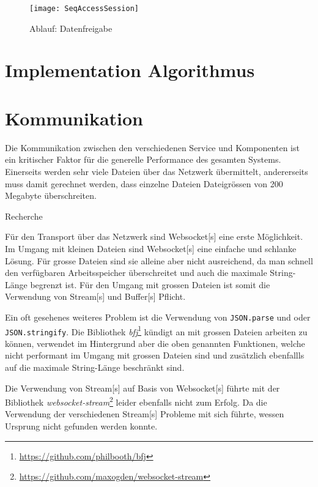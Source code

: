 
    \begin{figure}[H]
    \centering
    \texttt{[image: SeqAccessSession]}
    \caption{Ablauf: Datenfreigabe}
    \label{fig:seqaccesssession}
    \end{figure}







\section{Implementation Algorithmus}



\section{Kommunikation}

Die Kommunikation zwischen den verschiedenen Service und Komponenten ist ein kritischer Faktor für die generelle Performance des gesamten Systems. Einerseits werden sehr viele Dateien über das Ne\-tz\-we\-rk übermittelt, andererseits muss damit ge\-rech\-net werden, dass einzelne Dateien Dateigrössen von 200 Megabyte überschreiten.

Recherche

Für den Transport über das Netzwerk sind \gls{Websocket}[s] eine erste Möglichkeit. Im Umgang mit kleinen Dateien sind \gls{Websocket}[s] eine einfache und schlanke Lösung. Für grosse Dateien sind sie alleine aber nicht ausreichend, da man schnell den verfügbaren Arbeitsspeicher überschreitet und auch die maximale String-Länge begrenzt ist. Für den Umgang mit grossen Dateien ist somit die Verwendung von \gls{Stream}[s] und \gls{Buffer}[s] Pflicht. 

Ein oft gesehenes weiteres Problem ist die Verwendung von \texttt{JSON\-.parse} und oder \texttt{JSON.stringify}.
Die Bibliothek \textit{bfj}\footnote{\url{https://github.com/philbooth/bfj}} kündigt an mit grossen Dateien arbeiten zu können, verwendet im Hintergrund aber die oben genannten Funktionen, welche nicht performant im Umgang mit grossen Dateien sind und zusätzlich ebenfallls auf die maximale String-Länge beschränkt sind.

Die Verwendung von \gls{Stream}[s] auf Basis von \gls{Websocket}[s] führ\-te mit der Bi\-blio\-thek \textit{websocket-stream}\footnote{\url{https://github.com/maxogden/websocket-stream}} leider ebenfalls nicht zum Erfolg. Da die Verwendung der verschiedenen \gls{Stream}[s] Probleme mit sich führte, wessen Ursprung nicht gefunden werden konnte.

